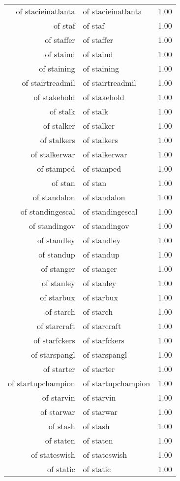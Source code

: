 \begin{table}[ht]
\begin{tabular}{rlr}
  of stacieinatlanta & of stacieinatlanta & 1.00 \\ 
  of staf & of staf & 1.00 \\ 
  of staffer & of staffer & 1.00 \\ 
  of staind & of staind & 1.00 \\ 
  of staining & of staining & 1.00 \\ 
  of stairtreadmil & of stairtreadmil & 1.00 \\ 
  of stakehold & of stakehold & 1.00 \\ 
  of stalk & of stalk & 1.00 \\ 
  of stalker & of stalker & 1.00 \\ 
  of stalkers & of stalkers & 1.00 \\ 
  of stalkerwar & of stalkerwar & 1.00 \\ 
  of stamped & of stamped & 1.00 \\ 
  of stan & of stan & 1.00 \\ 
  of standalon & of standalon & 1.00 \\ 
  of standingescal & of standingescal & 1.00 \\ 
  of standingov & of standingov & 1.00 \\ 
  of standley & of standley & 1.00 \\ 
  of standup & of standup & 1.00 \\ 
  of stanger & of stanger & 1.00 \\ 
  of stanley & of stanley & 1.00 \\ 
  of starbux & of starbux & 1.00 \\ 
  of starch & of starch & 1.00 \\ 
  of starcraft & of starcraft & 1.00 \\ 
  of starfckers & of starfckers & 1.00 \\ 
  of starspangl & of starspangl & 1.00 \\ 
  of starter & of starter & 1.00 \\ 
  of startupchampion & of startupchampion & 1.00 \\ 
  of starvin & of starvin & 1.00 \\ 
  of starwar & of starwar & 1.00 \\ 
  of stash & of stash & 1.00 \\ 
  of staten & of staten & 1.00 \\ 
  of stateswish & of stateswish & 1.00 \\ 
  of static & of static & 1.00 \\ 

\end{tabular}
\end{table}
